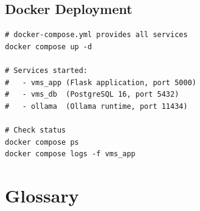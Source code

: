 \section*{Docker Deployment}

\begin{lstlisting}[style=bash, caption={Docker Compose Deployment}, label={lst:docker}]
# docker-compose.yml provides all services
docker compose up -d

# Services started:
#   - vms_app (Flask application, port 5000)
#   - vms_db  (PostgreSQL 16, port 5432)
#   - ollama  (Ollama runtime, port 11434)

# Check status
docker compose ps
docker compose logs -f vms_app
\end{lstlisting}

\chapter{Glossary}
\label{app:glossary}

